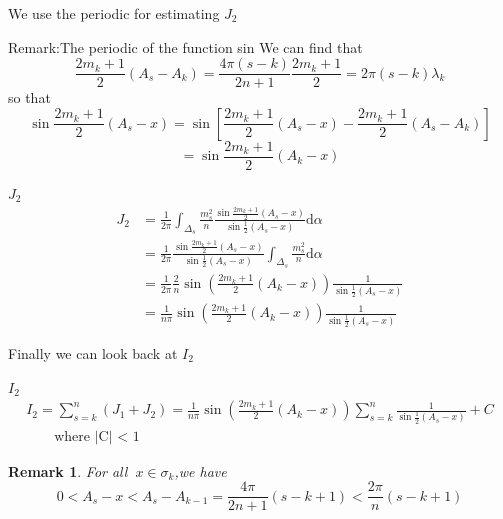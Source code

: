 \documentclass{beamer}
\newtheorem{remark}{Remark}
\begin{document}
\begin{frame}{We use the periodic for estimating $ J_2 $}
    \begin{block}{Remark:The periodic of the function sin }
        We can find that 
    \[ \frac{2m_k+1}{2}(A_s-A_k)=\frac{4\pi(s-k)}{2n+1}\frac{2m_k+1}{2}=2\pi(s-k)\lambda_k \]
    so that 
    \[ \sin\frac{2m_k+1}{2}(A_s-x)=\sin\left[\frac{2m_k+1}{2}(A_s-x)-\frac{2m_k+1}{2}(A_s-A_k)\right]\]
    \[ =\sin\frac{2m_k+1}{2}(A_k-x) \]
    \end{block}
\end{frame}



\begin{frame}{$ J_2 $}
    \begin{align*}
        J_2&= \frac{1}{2\pi}\int_{\Delta_s}\frac{m_s^2}{n}\frac{\sin\frac{2m_k+1}{2}(A_s-x)}{\sin\frac{1}{2}(A_s-x)}\mathrm{d}\alpha\\
        &=\frac{1}{2\pi}\frac{\sin\frac{2m_k+1}{2}(A_s-x)}{\sin\frac{1}{2}(A_s-x)}\int_{\Delta_s}\frac{m_s^2}{n}\mathrm{d}\alpha\\
        &=\frac{1}{2\pi}\frac{2}{n}\sin\left(\frac{2m_k+1}{2}(A_k-x) \right)\frac{1}{\sin\frac{1}{2}(A_s-x)}\\
        &= \frac{1}{n\pi}\sin\left(\frac{2m_k+1}{2}(A_k-x) \right)\frac{1}{\sin\frac{1}{2}(A_s-x)}
    \end{align*}
\end{frame}


\begin{frame}{Finally we can look back at $ I_2 $}
    \begin{block}{$ I_2 $}
        \begin{align*}
            I_2=\sum_{s=k}^{n}(J_1+J_2)=\frac{1}{n\pi}\sin\left(\frac{2m_k+1}{2}(A_k-x) \right)\sum_{s=k}^{n}\frac{1}{\sin\frac{1}{2}(A_s-x)}+C \\
            \quad \quad \text{where |C| < 1}
        \end{align*}
    \end{block}

    \begin{remark}
    
        For all $\ x \in \sigma_k$,we have 
        \[ 0<A_s-x<A_s-A_{k-1}=\frac{4\pi}{2n+1}(s-k+1)<\frac{2\pi}{n}(s-k+1) \]
    \end{remark}
\end{frame}
\end{document}
